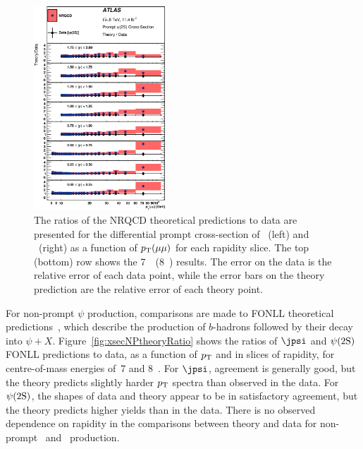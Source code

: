 \begin{description}[style=unboxed,leftmargin=0cm]
\begin{figure} [!ht]
\begin{center}
    \includegraphics[width=0.44\textwidth]{figures/ct_8TeV_Psi2SP_theoryRatio_lin.eps}\hfil
    \caption{The ratios of the NRQCD theoretical predictions to data are presented for the differential prompt cross-section of \jpsi\ (left) and \psiprime\ (right) as a function 
    of $\mbox{$p_{\text{T}}$}(\mu\mu)$ for each rapidity slice. 
    The top (bottom) row shows the 7~\TeV\ (8~\TeV) results.
    The error on the data is the relative error of each data point, while the error bars on the theory prediction are the relative error of each theory point.}
    \label{fig:xsecPtheoryRatio}
  \end{center}
\end{figure} 

For non-prompt $\psi$ production, comparisons are made to FONLL theoretical predictions~\cite{FONLL_2001,Cacciari:2012ny}, which describe the production of 
$b$-hadrons followed by their decay into $\psi+X$.
Figure~\ref{fig:xsecNPtheoryRatio} shows the ratios of $\jpsi$ and $\psi(2\mathrm{S})$ FONLL predictions to data, as a function of $\mbox{$p_{\text{T}}$}$ and in slices of rapidity, 
for centre-of-mass energies of~7 and 8~\TeV.
For $\jpsi$, agreement is generally good, but the theory predicts slightly harder $\mbox{$p_{\text{T}}$}$ spectra than observed in the data.
For $\psi(2\mathrm{S})$, the shapes of data and theory appear to be in satisfactory agreement, but the theory predicts higher yields than in the data.
There is no observed dependence on rapidity in the comparisons between theory and data for non-prompt \jpsi\ and \psiprime\ production.



\end{description}
